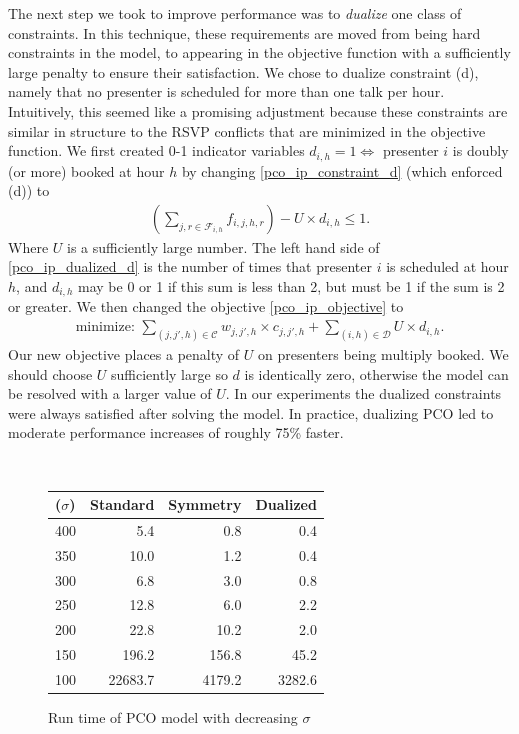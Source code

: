 \documentclass{svjour3}                     %
\begin{document}
The next step we took to improve performance was to \emph{dualize} one class of constraints.
In this technique, these requirements are moved from being hard constraints in the model, to appearing in the objective function with a sufficiently large penalty to ensure their satisfaction.
We chose to dualize constraint (d), namely that no presenter is scheduled for more than one talk per hour. 
Intuitively, this seemed like a promising adjustment because these constraints are similar in structure to the RSVP conflicts that are minimized in the objective function.
We first created 0-1 indicator variables $d_{i,h} = 1 \iff $ presenter $i$ is doubly (or more) booked at hour $h$ by changing \eqref{pco_ip_constraint_d} (which enforced (d)) to
\begin{gather}
	\left( \sum_{j,r \in \mathcal F_{i,h}} f_{i,j,h,r} \right) - U \times d_{i,h} \le 1. \label{pco_ip_dualized_d}
\end{gather}
Where $U$ is a sufficiently large number.
The left hand side of \eqref{pco_ip_dualized_d} is the number of times that presenter $i$ is scheduled at hour $h$, and $d_{i,h}$ may be 0 or 1 if this sum is less than 2, but must be 1 if the sum is 2 or greater. 
We then changed the objective \eqref{pco_ip_objective} to 
\begin{gather}
	\text{minimize: } \sum_{(j,j',h) \in \mathcal C} w_{j,j',h} \times c_{j,j',h} + \sum_{(i,h) \in \mathcal D} U \times d_{i,h}.
\end{gather}
Our new objective places a penalty of $U$ on presenters being multiply booked.
We should choose $U$ sufficiently large so $d$ is identically zero, otherwise the model can be resolved with a larger value of $U$. 
In our experiments the dualized constraints were always satisfied after solving the model.
In practice, dualizing PCO led to moderate performance increases of roughly 75\% faster.

\begin{figure}[h!]	
	\caption{Run time of PCO model with decreasing $\sigma$}
	\centering
	 \\
	\begin{tabular}{| l | r | r | r |}
		\hline
		 ($\sigma$) & Standard & Symmetry & Dualized \\ \hline
		 400 & 5.4 & 0.8 & 0.4 \\
		 350 & 10.0 & 1.2 & 0.4 \\
		 300 & 6.8 & 3.0 & 0.8\\
		 250 &12.8 &6.0 &2.2 \\
		 200 & 22.8 & 10.2 &2.0\\
		 150 & 196.2 & 156.8 & 45.2 \\
		 100 & 22683.7 & 4179.2 &3282.6 \\
		\hline
	\end{tabular}	
	\label{2013_normal_sigma_run_time}
\end{figure}
\end{document}
